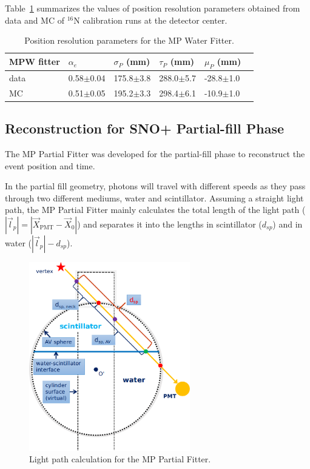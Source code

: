 \documentclass[preprint,12pt]{elsarticle}
\numberwithin{equation}{section}
\begin{document}
Table~\ref{table_posresol} summarizes the values of position resolution parameters obtained from data and MC of {$^{16}$}N calibration runs at the detector center.
\vspace{1mm}
\begin{table}[ht]
\centering
\caption{Position resolution parameters for the MP Water Fitter.}
\label{table_posresol}
\begin{tabular}{|p{2.5cm}|p{2.2cm}|p{2.1cm}|p{2.1cm}|p{2.1cm}| p{2.1cm}|}
\hline
MPW fitter & $\alpha_e$ & $\sigma_P$ (mm) &  $\tau_P$ (mm)& $\mu_P$ (mm)\\
\hline 
data& 0.58$\pm$0.04 & 175.8$\pm$3.8 & 288.0$\pm$5.7 & -28.8$\pm$1.0\\	
\hline 
MC & 0.51$\pm$0.05 & 195.2$\pm$3.3 & 298.4$\pm$6.1 & -10.9$\pm$1.0\\
\hline
\end{tabular}
\end{table}
\vspace{1mm}

\subsection{Reconstruction for SNO+ Partial-fill Phase}

The MP Partial Fitter was developed for the partial-fill phase to reconstruct the event position and time.

In the partial fill geometry, photons will travel with different speeds as they pass through two different mediums, water and scintillator. Assuming a straight light path, the MP Partial Fitter mainly calculates the total length of the light path ($|\vec{l}_p|=|\vec{X}_\mathrm{PMT}-\vec{X}_0|$) and separates it into the lengths in scintillator ($d_{sp}$) and in water ($|\vec{l}_p|-d_{sp}$).

\begin{figure}[!htb]
	\centering
	\includegraphics[width=7cm]{scintpath.png}
	\caption{Light path calculation for the MP Partial Fitter.}
	\label{scintpath}
\end{figure}
\end{document}
